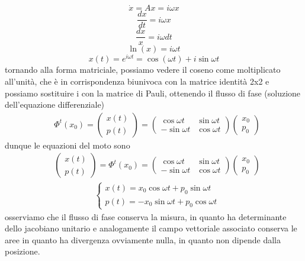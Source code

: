 \documentclass[
10pt, %
a4paper, %
oneside, %
headinclude,footinclude, %
BCOR5mm, %
]{scrartcl}
\begin{document}
\[\dot{x} = Ax = i\omega x\]
\[\frac{dx}{dt} = i\omega x\]
\[\frac{dx}{x} = i\omega dt\]
\[\ln(x) = i\omega t\]
\[x(t) = e^{i\omega t} = \cos(\omega t)+i\sin\omega t\]
tornando alla forma matriciale, possiamo vedere il coseno come moltiplicato all'unità, che è in corrispondenza biunivoca con la matrice identità 2x2 e possiamo sostituire i con la matrice di Pauli, ottenendo il flusso di fase (soluzione dell'equazione differenziale)
\begin{align*}
	&\Phi^t(x_0) = 
	\begin{pmatrix}
		x(t)\\
		p(t)
	\end{pmatrix}=
	\begin{pmatrix}
		\cos\omega t&\sin\omega t\\
		-\sin\omega t&\cos\omega t
	\end{pmatrix}
	\begin{pmatrix}
		x_0\\
		p_0
	\end{pmatrix}
\end{align*}
dunque le equazioni del moto sono
\begin{align*}
		&\begin{pmatrix}
			x(t)\\
			p(t)
		\end{pmatrix}
		= \Phi^t(x_0) = 
		\begin{pmatrix}
			\cos\omega t&\sin\omega t\\
			-\sin\omega t&\cos\omega t
		\end{pmatrix}
		\begin{pmatrix}
			x_0\\
			p_0
		\end{pmatrix}
\end{align*}
\begin{align*}
	&\begin{cases}
		x(t)=x_0\cos\omega t+p_0\sin\omega t\\
		p(t)=-x_0\sin\omega t+p_0\cos\omega t
	\end{cases}
\end{align*}
osserviamo che il flusso di fase conserva la misura, in quanto ha determinante dello jacobiano unitario e analogamente il campo vettoriale associato conserva le aree in quanto ha divergenza ovviamente nulla, in quanto non dipende dalla posizione.
\end{document}
